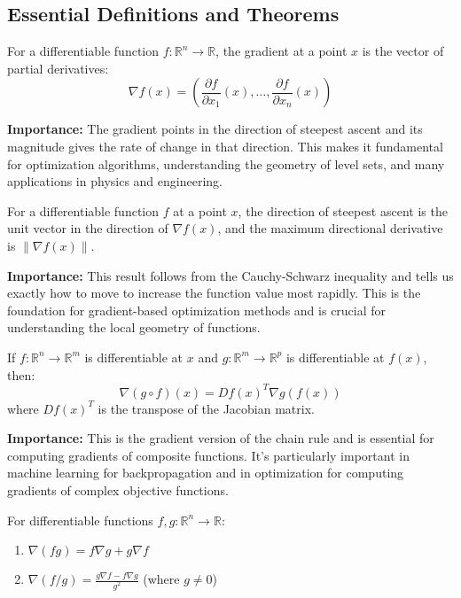 \subsection*{Essential Definitions and Theorems}

\begin{definition}[Gradient]
For a differentiable function $f: \mathbb{R}^n \to \mathbb{R}$, the gradient at a point $x$ is the vector of partial derivatives:
\[\nabla f(x) = \left(\frac{\partial f}{\partial x_1}(x), \ldots, \frac{\partial f}{\partial x_n}(x)\right)\]
\end{definition}

\noindent\textbf{Importance:} The gradient points in the direction of steepest ascent and its magnitude gives the rate of change in that direction. This makes it fundamental for optimization algorithms, understanding the geometry of level sets, and many applications in physics and engineering.



\begin{definition}
For a differentiable function $f$ at a point $x$, the direction of steepest ascent is the unit vector in the direction of $\nabla f(x)$, and the maximum directional derivative is $\|\nabla f(x)\|$.
\end{definition}

\noindent\textbf{Importance:} This result follows from the Cauchy-Schwarz inequality and tells us exactly how to move to increase the function value most rapidly. This is the foundation for gradient-based optimization methods and is crucial for understanding the local geometry of functions.



\begin{theorem}
If $f: \mathbb{R}^n \to \mathbb{R}^m$ is differentiable at $x$ and $g: \mathbb{R}^m \to \mathbb{R}^p$ is differentiable at $f(x)$, then:
\[\nabla(g \circ f)(x) = Df(x)^T \nabla g(f(x))\]
where $Df(x)^T$ is the transpose of the Jacobian matrix.
\end{theorem}

\noindent\textbf{Importance:} This is the gradient version of the chain rule and is essential for computing gradients of composite functions. It's particularly important in machine learning for backpropagation and in optimization for computing gradients of complex objective functions.



\begin{theorem}
For differentiable functions $f, g: \mathbb{R}^n \to \mathbb{R}$:
\begin{enumerate}[label=(\alph*)]
\item $\nabla(fg) = f \nabla g + g \nabla f$
\item $\nabla(f/g) = \frac{g \nabla f - f \nabla g}{g^2}$ (where $g \neq 0$)
\end{enumerate}
\end{theorem}

